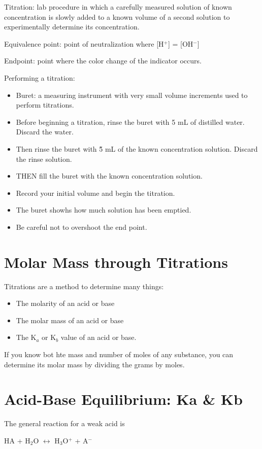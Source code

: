 \documentclass[../hchem.tex]{subfiles}
\begin{document}
Titration: lab procedure in which a carefully measured solution of known concentration is slowly added to a known volume of a second solution to experimentally determine its concentration.

Equivalence point: point of neutralization where [H$^+$] = [OH$^-$]

Endpoint: point where the color change of the indicator occurs.

Performing a titration:
\begin{itemize}
    \item Buret: a measuring instrument with very small volume increments used to perform titrations.
    \item Before beginning a titration, rinse the buret with 5 mL of distilled water. Discard the water.
    \item Then rinse the buret with \~ 5 mL of the known concentration solution. Discard the rinse solution.
    \item THEN fill the buret with the known concentration solution.
    \item Record your initial volume and begin the titration.
    \item The buret showhs how much solution has been emptied. 
    \item Be careful not to overshoot the end point.
\end{itemize}
\section{Molar Mass through Titrations}
Titrations are a method to determine many things:
\begin{itemize}
    \item The molarity of an acid or base 
    \item The molar mass of an acid or base 
    \item The K$_a$ or K$_b$ value of an acid or base.
\end{itemize}

If you know bot hte mass and number of moles of any substance, you can determine its molar mass by dividing the grams by moles.
\section{Acid-Base Equilibrium: Ka \& Kb}
The general reaction for a weak acid is 
\begin{center}
    HA + H$_2$O $\leftrightarrow$ H$_3$O$^+$ + A$^-$
\end{center}
\end{document}
